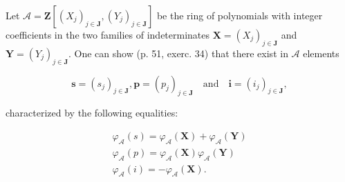 Let \(\mathcal{A} = \mathbf{Z}[(X_j)_{j\in\mathbf{J}},(Y_j)_{j\in\mathbf{J}}]\) be the ring of polynomials with integer coefficients in the two families of indeterminates \(\mathbf{X} = (X_j)_{j\in\mathbf{J}}\) and \(\mathbf{Y} = (Y_j)_{j\in\mathbf{J}}\). One can show (p. 51, exerc. 34) that there exist in \(\mathcal{A}\) elements

\[
\boldsymbol {s} = (s _ {j}) _ {j \in \mathbf {J}}, \boldsymbol {p} = (p _ {j}) _ {j \in \mathbf {J}} \quad \text{and} \quad \boldsymbol {i} = (i _ {j}) _ {j \in \mathbf {J}},
\]

characterized by the following equalities:

\[
\begin{array}{l} \varphi_ {\mathcal {A}} (s) = \varphi_ {\mathcal {A}} (\mathbf {X}) + \varphi_ {\mathcal {A}} (\mathbf {Y}) \\ \varphi_ {\mathcal {A}} (p) = \varphi_ {\mathcal {A}} (\mathbf {X}) \varphi_ {\mathcal {A}} (\mathbf {Y}) \\ \varphi_ {\mathcal {A}} (i) = - \varphi_ {\mathcal {A}} (\mathbf {X}). \end{array}
\]

